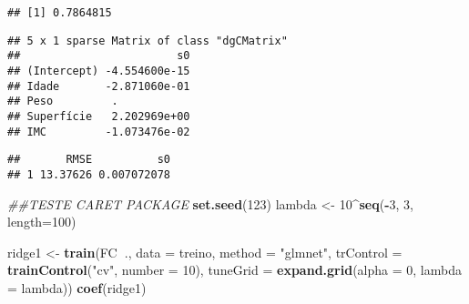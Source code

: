\documentclass[]{article}
\newenvironment{Shaded}{\begin{snugshade}}{\end{snugshade}}
\newcommand{\CommentTok}[1]{\textcolor[rgb]{0.56,0.35,0.01}{\textit{#1}}}
\newcommand{\DataTypeTok}[1]{\textcolor[rgb]{0.13,0.29,0.53}{#1}}
\newcommand{\DecValTok}[1]{\textcolor[rgb]{0.00,0.00,0.81}{#1}}
\newcommand{\KeywordTok}[1]{\textcolor[rgb]{0.13,0.29,0.53}{\textbf{#1}}}
\newcommand{\NormalTok}[1]{#1}
\newcommand{\OperatorTok}[1]{\textcolor[rgb]{0.81,0.36,0.00}{\textbf{#1}}}
\newcommand{\StringTok}[1]{\textcolor[rgb]{0.31,0.60,0.02}{#1}}
\begin{document}
\begin{verbatim}
## [1] 0.7864815
\end{verbatim}

\begin{Shaded}
\end{Shaded}

\begin{verbatim}
## 5 x 1 sparse Matrix of class "dgCMatrix"
##                        s0
## (Intercept) -4.554600e-15
## Idade       -2.871060e-01
## Peso         .           
## Superfície   2.202969e+00
## IMC         -1.073476e-02
\end{verbatim}

\begin{Shaded}
\end{Shaded}

\begin{verbatim}
##       RMSE          s0
## 1 13.37626 0.007072078
\end{verbatim}

\begin{Shaded}
\begin{Highlighting}[]
\CommentTok{##TESTE CARET PACKAGE}
\KeywordTok{set.seed}\NormalTok{(}\DecValTok{123}\NormalTok{)}
\NormalTok{lambda <-}\StringTok{ }\DecValTok{10}\OperatorTok{^}\KeywordTok{seq}\NormalTok{(}\OperatorTok{-}\DecValTok{3}\NormalTok{, }\DecValTok{3}\NormalTok{, }\DataTypeTok{length=}\DecValTok{100}\NormalTok{)}
 
\NormalTok{ridge1 <-}\StringTok{ }\KeywordTok{train}\NormalTok{(FC}\OperatorTok{~}\NormalTok{., }\DataTypeTok{data =}\NormalTok{ treino, }\DataTypeTok{method =} \StringTok{"glmnet"}\NormalTok{, }\DataTypeTok{trControl =} \KeywordTok{trainControl}\NormalTok{(}\StringTok{"cv"}\NormalTok{, }\DataTypeTok{number =} \DecValTok{10}\NormalTok{), }\DataTypeTok{tuneGrid =} \KeywordTok{expand.grid}\NormalTok{(}\DataTypeTok{alpha =} \DecValTok{0}\NormalTok{, }\DataTypeTok{lambda =}\NormalTok{ lambda))}
\KeywordTok{coef}\NormalTok{(ridge1)}
\end{Highlighting}
\end{Shaded}
\end{document}
